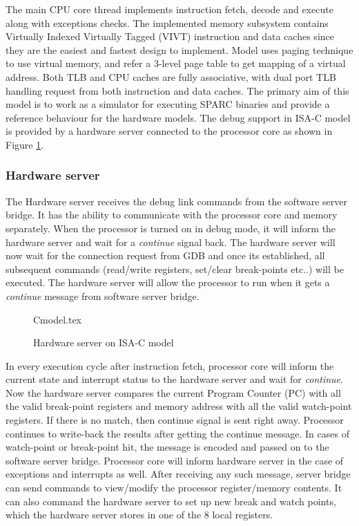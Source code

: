 The main CPU core thread implements instruction fetch, decode and execute along with exceptions checks. The implemented memory subsystem contains Virtually Indexed Virtually Tagged (VIVT) instruction and data caches since they are the easiest and fastest design to implement. Model uses paging technique to use virtual memory, and refer a 3-level page table to get mapping of a virtual address. Both TLB and CPU caches are fully associative, with dual port TLB handling request from both instruction and data caches. The primary aim of this model is to work as a simulator for executing SPARC binaries and provide a reference behaviour for the hardware models. The debug support in ISA-C model is provided by a hardware server connected to the processor core as shown in Figure \ref{Cmodel}.

\subsubsection{Hardware server}
The Hardware server receives the debug link commands from the software server bridge. It has the ability to communicate with the processor core and memory separately. When the processor is turned on in debug mode, it will inform the hardware server and wait for a \textit{continue} signal back. The hardware server will now wait for the connection request from GDB and once its established, all subsequent commands (read/write registers, set/clear break-points etc..) will be executed. The hardware server will allow the processor to run when it gets a \textit{continue} message from software server bridge.

\begin{figure}[h!]
	\centering
	\def\svgwidth{0.45\columnwidth}
	{Cmodel.tex}
	\caption{Hardware server on ISA-C model}
	\label{Cmodel}
\end{figure}

In every execution cycle after instruction fetch, processor core will inform the current state and interrupt status to the hardware server and wait for \textit{continue}. Now the hardware server compares the current Program Counter (PC) with all the valid break-point registers and memory address with all the valid watch-point registers. If there is no match, then continue signal is sent right away. Processor continues to write-back the results after getting the continue message. In cases of watch-point or break-point hit, the message is encoded and passed on to the software server bridge. Processor core will inform hardware server in the case of exceptions and interrupts as well. After receiving any such message, server bridge can send commands to view/modify the processor register/memory contents. It can also command the hardware server to set up new break and watch points, which the hardware server stores in one of the 8 local registers.



